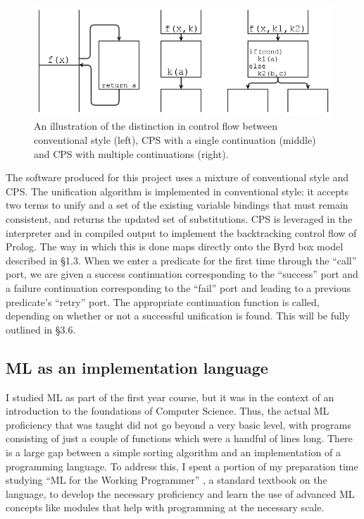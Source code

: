 \documentclass[12pt]{article}
\begin{document}
\begin{figure}[H]
\includegraphics[scale=0.81]{CPS.png}
\caption{An illustration of the distinction in control flow between conventional style (left), CPS with a single continuation (middle) and CPS with multiple continuations (right).}
\end{figure}

The software produced for this project uses a mixture of conventional style and CPS. 
The unification algorithm is implemented in conventional style: it accepts two terms to unify and a set of the existing variable bindings that must remain consistent, and returns the updated set of substitutions. 
CPS is leveraged in the interpreter and in compiled output to implement the backtracking control flow of Prolog.
The way in which this is done maps directly onto the Byrd box model described in \S1.3. 
When we enter a predicate for the first time through the ``call'' port, we are given a success continuation corresponding to the ``success'' port and a failure continuation corresponding to the ``fail'' port and leading to a previous predicate's ``retry'' port.
The appropriate continuation function is called, depending on whether or not a successful unification is found.
This will be fully outlined in \S3.6.

\subsection{ML as an implementation language}

I studied ML as part of the first year course, but it was in the context of an introduction to the foundations of Computer Science. 
Thus, the actual ML proficiency that was taught did not go beyond a very basic level, with programs consisting of just a couple of functions which were a handful of lines long. 
There is a large gap between a simple sorting algorithm and an implementation of a programming language. 
To address this, I spent a portion of my preparation time studying ``ML for the Working Programmer'' \cite{ML}, a standard textbook on the language, to develop the necessary proficiency and learn the use of advanced ML concepts like modules that help with programming at the necessary scale.
\end{document}
